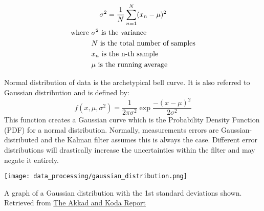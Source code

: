         
        \begin{gather} \labeq{variance}
            \sigma^2 = \frac{1}{N} \sum_{n=1}^{N} (x_n - \mu)^2 \\ 
            \begin{aligned}
                \text{where } &\sigma^2 \text{ is the variance} \\
                &N \text{ is the total number of samples} \\
                &x_n \text{ is the n-th sample} \\
                &\mu \text{ is the running average}
            \end{aligned} \notag
        \end{gather}

        \begin{kaobox}[frametitle=Aside: Normal Distribution]
            Normal distribution of data is the archetypical bell curve.
            It is also referred to Gaussian distribution and is defined by:
            \begin{equation*}
                f(x, \mu, \sigma^2) = \frac{1}{2\pi\sigma^2} \exp{\frac{-(x-\mu)^2}{2\sigma^2}}
            \end{equation*}
            This function creates a Gaussian curve which is the Probability Density Function (PDF) for a normal distribution.
            Normally, measurements errors are Gaussian-distributed and the Kalman filter assumes this is always the case.
            Different error distributions will drastically increase the uncertainties within the filter and may negate it entirely.
        \end{kaobox}
        
        \begin{marginfigure}[-2in]
            \texttt{[image: data\_processing/gaussian\_distribution.png]}
            \caption[Aside: Gaussian Distribution]{A graph of a Gaussian distribution with the 1st standard deviations shown.
            Retrieved from \href{https://accadandkoka.com/blog/how-normal-is-the-normal-distribution/}{The Akkad and Koda Report}}
        \end{marginfigure}

